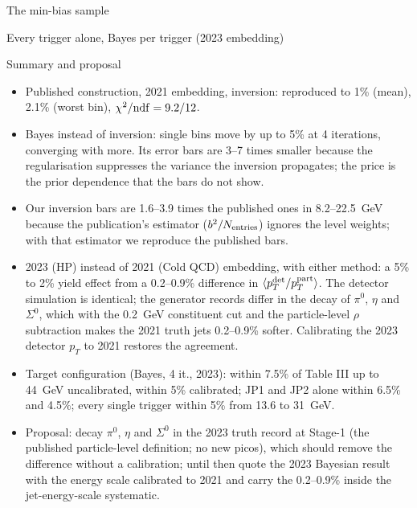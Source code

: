 \begin{frame}{The min-bias sample}
\end{frame}

\begin{frame}{Every trigger alone, Bayes per trigger (2023 embedding)}
\end{frame}

\begin{frame}{Summary and proposal}
\begin{itemize}
\item Published construction, 2021 embedding, inversion: reproduced to 1\% (mean), 2.1\% (worst bin), $\chi^2/{\rm ndf}=9.2/12$.
\item Bayes instead of inversion: single bins move by up to 5\% at 4 iterations, converging with more. Its error bars are 3--7 times smaller because the regularisation suppresses the variance the inversion propagates; the price is the prior dependence that the bars do not show.
\item Our inversion bars are 1.6--3.9 times the published ones in 8.2--22.5~GeV because the publication's estimator ($b^2/N_{\rm entries}$) ignores the level weights; with that estimator we reproduce the published bars.
\item 2023 (HP) instead of 2021 (Cold QCD) embedding, with either method: a 5\% to 2\% yield effect from a 0.2--0.9\% difference in $\langle p_T^{\rm det}/p_T^{\rm part}\rangle$. The detector simulation is identical; the generator records differ in the decay of $\pi^0$, $\eta$ and $\Sigma^0$, which with the 0.2~GeV constituent cut and the particle-level $\rho$ subtraction makes the 2021 truth jets 0.2--0.9\% softer. Calibrating the 2023 detector $p_T$ to 2021 restores the agreement.
\item Target configuration (Bayes, 4 it., 2023): within 7.5\% of Table III up to 44~GeV uncalibrated, within 5\% calibrated; JP1 and JP2 alone within 6.5\% and 4.5\%; every single trigger within 5\% from 13.6 to 31~GeV.
\item Proposal: decay $\pi^0$, $\eta$ and $\Sigma^0$ in the 2023 truth record at Stage-1 (the published particle-level definition; no new picos), which should remove the difference without a calibration; until then quote the 2023 Bayesian result with the energy scale calibrated to 2021 and carry the 0.2--0.9\% inside the jet-energy-scale systematic.
\end{itemize}
\end{frame}

